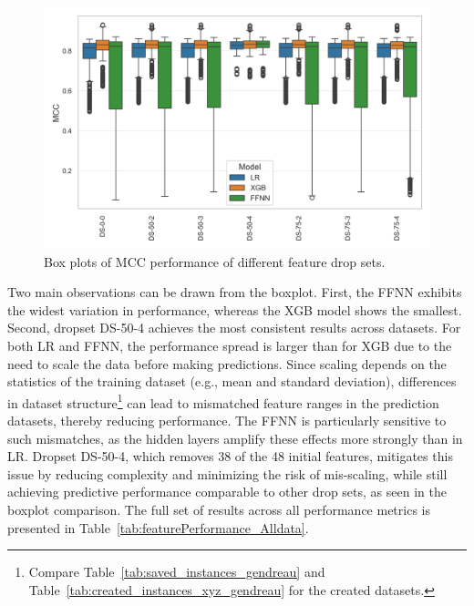 \begin{figure}[ht]
	\centering
	\includegraphics[width = .85\textwidth]{pictures/feature_filter/all_data_exceptSubsets_box_plot.png}
	\caption{Box plots of MCC performance of different feature drop sets.}
	\label{fig:mcc_filter_results}
\end{figure}
Two main observations can be drawn from the boxplot. First, the FFNN exhibits the widest variation in performance, whereas the XGB model
shows the smallest. Second, dropset DS-50-4 achieves the most consistent results across datasets. For both LR and FFNN, the performance
spread is larger than for XGB due to the need to scale the data before making predictions. Since scaling depends on the statistics of
the training dataset (e.g., mean and standard deviation), differences in dataset structure\footnote{Compare Table~\ref{tab:saved_instances_gendreau} and Table~\ref{tab:created_instances_xyz_gendreau} for the created datasets.}
can lead to mismatched feature ranges in the prediction datasets, thereby reducing performance. The FFNN is particularly sensitive
to such mismatches, as the hidden layers amplify these effects more strongly than in LR. Dropset DS-50-4, which removes 38 of
the 48 initial features, mitigates this issue by reducing complexity and minimizing the risk of mis-scaling, while still
achieving predictive performance comparable to other drop sets, as seen in the boxplot comparison. The full set of results across
all performance metrics is presented in Table~\ref{tab:featurePerformance_Alldata}.

